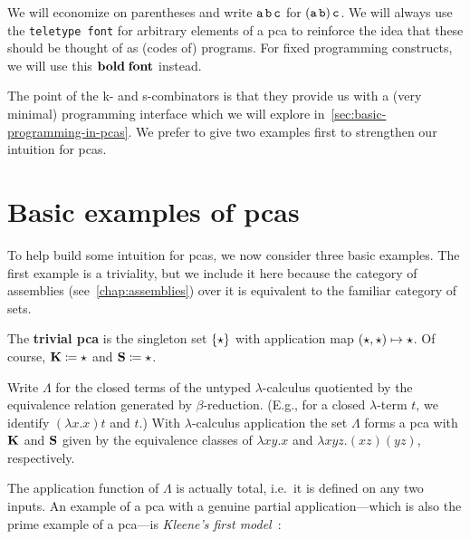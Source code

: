 \begin{notation}
  We will economize on parentheses and write \(\operatorname{\mathtt{a}}\operatorname{\mathtt{b}}\operatorname{\mathtt{c}}\) for
  \((\operatorname{\mathtt{a}}\operatorname{\mathtt{b}})\operatorname{\mathtt{c}}\).
  We will always use the \texttt{teletype font} for arbitrary elements of a pca
  to reinforce the idea that these should be thought of as (codes of) programs.
  For fixed programming constructs, we will use this \(\operatorname{\mathbf{bold\; font}}\)
  instead.
\end{notation}

The point of the k- and s-combinators is that they provide us with a (very
minimal) programming interface which we will explore
in~\cref{sec:basic-programming-in-pcas}.
%
We prefer to give two examples first to strengthen our intuition for pcas.

\section{Basic examples of pcas}\label{sec:basic-examples-of-pcas}

To help build some intuition for pcas, we now consider three basic examples. The
first example is a triviality, but we include it here because the category of
assemblies (see~\cref{chap:assemblies}) over it is equivalent to the familiar category of
sets.

\begin{example}
  The \textbf{trivial pca} is the singleton set \(\{\star\}\) with
  application map \((\star,\star) \mapsto \star\).
  Of course, \(\operatorname{\mathbf{K}} \coloneq \star\) and \(\operatorname{\mathbf{S}} \coloneq \star\).
\end{example}

\begin{example}
  Write \(\Lambda\) for the closed terms of the untyped \(\lambda\)-calculus
  quotiented by the equivalence relation generated by
  \(\beta\)-reduction. (E.g., for a closed \(\lambda\)-term \(t\), we identify
  \((\lambda{x}.{x})t\) and \(t\).)
  With \(\lambda\)-calculus application the set \(\Lambda\) forms a pca with
  \(\operatorname{\mathbf{K}}\) and \(\operatorname{\mathbf{S}}\) given by the equivalence classes of
  \(\lambda{xy}.x\) and \(\lambda{xyz}.(xz)(yz)\), respectively.
\end{example}

The application function of \(\Lambda\) is actually total, i.e.\ it is defined
on any two inputs. An example of a pca with a genuine partial application---which
is also the prime example of a pca---is \emph{Kleene's first model}~\cite{Kleene1945}:

